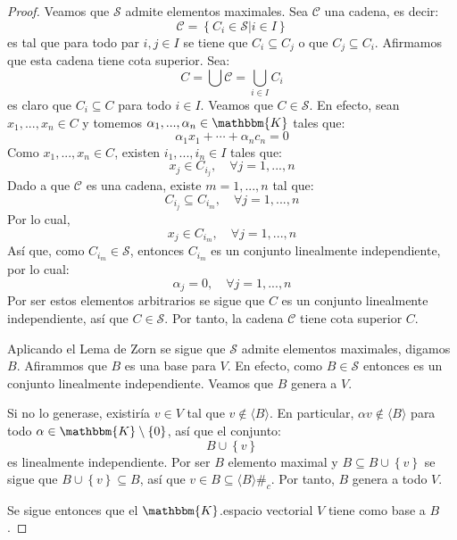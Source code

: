 \documentclass[12pt]{article}
\newcounter{it}
\theoremstyle{largebreak}
\newcommand{\bbm}[1]{\mathbbm{#1}}
\newcommand\contradiction{\ensuremath{\#_c}}
\begin{document}
\begin{proof}
        Veamos que $\mathcal{S}$ admite elementos maximales. Sea $\mathcal{C}$ una cadena, es decir:
        \begin{equation*}
            \mathcal{C}=\left\{C_i\in\mathcal{S}\Big|i\in I \right\}
        \end{equation*}
        es tal que para todo par $i,j\in I$ se tiene que $C_i\subseteq C_j$ o que $C_j\subseteq C_i$. Afirmamos que esta cadena tiene cota superior. Sea:
        \begin{equation*}
            C=\bigcup\mathcal{C}=\bigcup_{ i\in I}C_i
        \end{equation*}
        es claro que $C_i\subseteq C$ para todo $i\in I$. Veamos que $C\in\mathcal{S}$. En efecto, sean $x_1,...,x_n\in C$ y tomemos $\alpha_1,...,\alpha_n\in\bbm{K}$ tales que:
        \begin{equation*}
            \alpha_1x_1+\cdots+\alpha_nc_n=0
        \end{equation*}
        Como $x_1,...,x_n\in C$, existen $i_1,...,i_n\in I$ tales que:
        \begin{equation*}
            x_j\in C_{ i_j},\quad\forall j=1,...,n
        \end{equation*}
        Dado a que $\mathcal{C}$ es una cadena, existe $m=1,...,n$ tal que:
        \begin{equation*}
            C_{i_j}\subseteq C_{ i_m},\quad\forall j=1,...,n
        \end{equation*}
        Por lo cual,
        \begin{equation*}
            x_j\in C_{ i_m},\quad\forall j=1,...,n
        \end{equation*}
        Así que, como $C_{ i_m}\in\mathcal{S}$, entonces $C_{ i_m}$ es un conjunto linealmente independiente, por lo cual:
        \begin{equation*}
            \alpha_j=0,\quad\forall j=1,...,n
        \end{equation*}
        Por ser estos elementos arbitrarios se sigue que $C$ es un conjunto linealmente independiente, así que $C\in\mathcal{S}$. Por tanto, la cadena $\mathcal{C}$ tiene cota superior $C$.

        Aplicando el Lema de Zorn se sigue que $\mathcal{S}$ admite elementos maximales, digamos $B$. Afirammos que $B$ es una base para $V$. En efecto, como $B\in\mathcal{S}$ entonces es un conjunto linealmente independiente. Veamos que $B$ genera a $V$. 
        
        Si no lo generase, existiría $v\in V$ tal que $v\notin\langle B\rangle$. En particular, $\alpha v\notin\langle B\rangle$ para todo $\alpha\in\bbm{K}\setminus\left\{0\right\}$, así que el conjunto:
        \begin{equation*}
            B\cup\left\{v\right\}
        \end{equation*}
        es linealmente independiente. Por ser $B$ elemento maximal y $B\subseteq B\cup\left\{v\right\}$ se sigue que $B\cup\left\{v\right\}\subseteq B$, así que $v\in B\subseteq\langle B\rangle$\contradiction. Por tanto, $B$ genera a todo $V$.

        Se sigue entonces que el $\bbm{K}$.espacio vectorial $V$ tiene como base a $B$.
    \end{proof}
\end{document}
